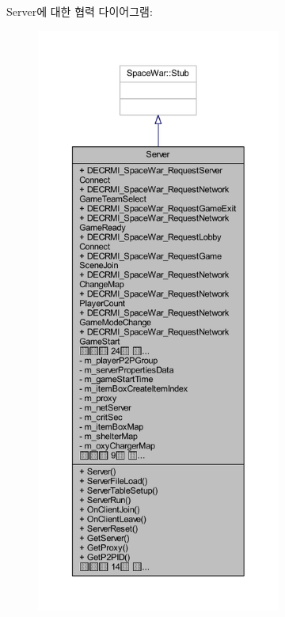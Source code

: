 Server에 대한 협력 다이어그램\+:
\nopagebreak
\begin{figure}[H]
\begin{center}
\leavevmode
\includegraphics[height=550pt]{class_server__coll__graph}
\end{center}
\end{figure}
